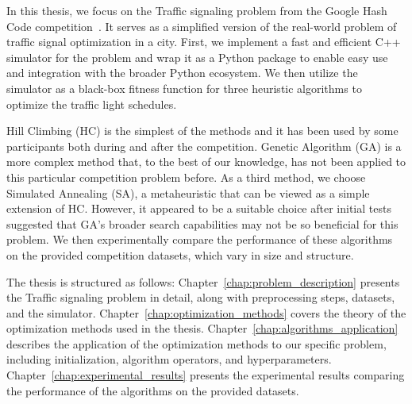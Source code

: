 In this thesis, we focus on the Traffic signaling problem from the Google Hash Code competition~\cite{google2023google}. It serves as a simplified version of the real-world problem of traffic signal optimization in a city. First, we implement a fast and efficient C++ simulator for the problem and wrap it as a Python package to enable easy use and integration with the broader Python ecosystem.
We then utilize the simulator as a black-box fitness function for three heuristic algorithms to optimize the traffic light schedules.

Hill Climbing (HC) is the simplest of the methods and it has been used by some participants both during and after the competition.
Genetic Algorithm (GA) is a more complex method that, to the best of our knowledge, has not been applied to this particular competition problem before.
As a third method, we choose Simulated Annealing (SA), a metaheuristic that can be viewed as a simple extension of HC. However, it appeared to be a suitable choice after initial tests suggested that GA's broader search capabilities may not be so beneficial for this problem.
We then experimentally compare the performance of these algorithms on the provided competition datasets, which vary in size and structure.

The thesis is structured as follows:
Chapter~\ref{chap:problem_description} presents the Traffic signaling problem in detail, along with preprocessing steps, datasets, and the simulator.
Chapter~\ref{chap:optimization_methods} covers the theory of the optimization methods used in the thesis.
Chapter~\ref{chap:algorithms_application} describes the application of the optimization methods to our specific problem, including initialization, algorithm operators, and hyperparameters.
Chapter~\ref{chap:experimental_results} presents the experimental results comparing the performance of the algorithms on the provided datasets.
